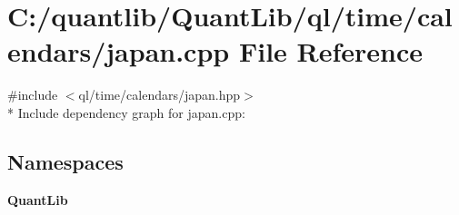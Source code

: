 \section{C\+:/quantlib/\+Quant\+Lib/ql/time/calendars/japan.cpp File Reference}
\label{japan_8cpp}
{\ttfamily \#include $<$ql/time/calendars/japan.\+hpp$>$}\\*
Include dependency graph for japan.\+cpp\+:
\subsection*{Namespaces}
\begin{DoxyCompactItemize}
\item 
 {\bf Quant\+Lib}
\end{DoxyCompactItemize}
